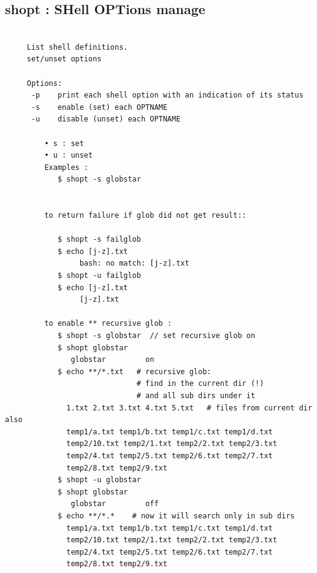 \documentclass[a4paper,12pt]{article}
\begin{document}
\subsection{shopt     : SHell OPTions manage}
\begin{verbatim}
     
     List shell definitions.
     set/unset options

     Options:
      -p	print each shell option with an indication of its status
      -s	enable (set) each OPTNAME
      -u	disable (unset) each OPTNAME

         • s : set
         • u : unset
         Examples : 
            $ shopt -s globstar           
            
            
         to return failure if glob did not get result::
﻿
            $ shopt -s failglob
            $ echo [j-z].txt
                 bash: no match: [j-z].txt
            $ shopt -u failglob
            $ echo [j-z].txt
                 [j-z].txt
           
         to enable ** recursive glob :
            $ shopt -s globstar  // set recursive glob on
            $ shopt globstar
               globstar       	on
            $ echo **/*.txt   # recursive glob: 
                              # find in the current dir (!)
                              # and all sub dirs under it 
              1.txt 2.txt 3.txt 4.txt 5.txt   # files from current dir also
              temp1/a.txt temp1/b.txt temp1/c.txt temp1/d.txt
              temp2/10.txt temp2/1.txt temp2/2.txt temp2/3.txt
              temp2/4.txt temp2/5.txt temp2/6.txt temp2/7.txt
              temp2/8.txt temp2/9.txt
            $ shopt -u globstar
            $ shopt globstar
               globstar       	off
            $ echo **/*.*    # now it will search only in sub dirs
              temp1/a.txt temp1/b.txt temp1/c.txt temp1/d.txt 
              temp2/10.txt temp2/1.txt temp2/2.txt temp2/3.txt 
              temp2/4.txt temp2/5.txt temp2/6.txt temp2/7.txt 
              temp2/8.txt temp2/9.txt
\end{verbatim}
\end{document}
